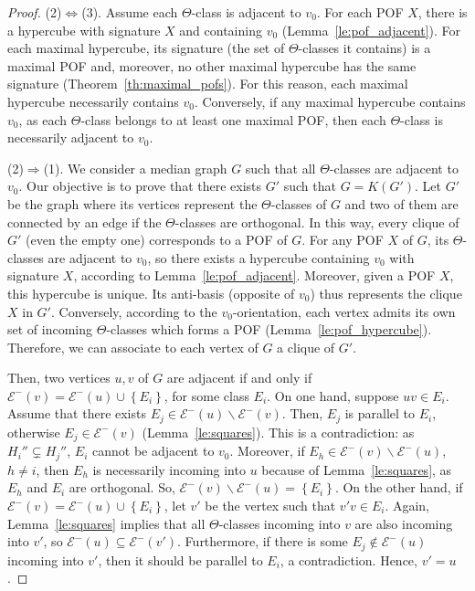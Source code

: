 \documentclass[a4paper,UKenglish,numberwithinsect,cleveref, autoref]{lipics-v2021}
\newcommand{\set}[1]{\left\{ #1 \right\}}
\begin{document}
\begin{proof}
(2)$\Leftrightarrow$(3). Assume each $\Theta$-class is adjacent to $v_0$. For each POF $X$, there is a hypercube with signature $X$ and containing $v_0$ (Lemma~\ref{le:pof_adjacent}). For each maximal hypercube, its signature (the set of $\Theta$-classes it contains) is a maximal POF and, moreover, no other maximal hypercube has the same signature (Theorem~\ref{th:maximal_pofs}). For this reason, each maximal hypercube necessarily contains $v_0$. 
Conversely, if any maximal hypercube contains $v_0$, as each $\Theta$-class belongs to at least one maximal POF, then each $\Theta$-class is necessarily adjacent to $v_0$.

(2)$\Rightarrow$(1). We consider a median graph $G$ such that all $\Theta$-classes are adjacent to $v_0$. Our objective is to prove that there exists $G'$ such that $G = K(G')$. Let $G'$ be the graph where its vertices represent the $\Theta$-classes of $G$ and two of them are connected by an edge if the $\Theta$-classes are orthogonal. In this way, every clique of $G'$ (even the empty one) corresponds to a POF of $G$. For any POF $X$ of $G$, its $\Theta$-classes are adjacent to $v_0$, so there exists a hypercube containing $v_0$ with signature $X$, according to Lemma~\ref{le:pof_adjacent}. Moreover, given a POF $X$, this hypercube is unique. Its anti-basis (opposite of $v_0$) thus represents the clique $X$ in $G'$. Conversely, according to the $v_0$-orientation, each vertex admits its own set of incoming $\Theta$-classes which forms a POF (Lemma~\ref{le:pof_hypercube}). Therefore, we can associate to each vertex of $G$ a clique of $G'$. 

Then, two vertices $u,v$ of $G$ are adjacent if and only if $\mathcal{E}^-(v) = \mathcal{E}^-(u) \cup \set{E_i}$, for some class $E_i$. On one hand, suppose $uv \in E_i$. Assume that there exists $E_j \in \mathcal{E}^-(u) \backslash \mathcal{E}^-(v)$. Then, $E_j$ is parallel to $E_i$, otherwise $E_j \in \mathcal{E}^-(v)$ (Lemma~\ref{le:squares}). This is a contradiction: as $H_i'' \subsetneq H_j''$, $E_i$ cannot be adjacent to $v_0$. Moreover, if $E_h \in \mathcal{E}^-(v) \backslash \mathcal{E}^-(u)$, $h \neq i$, then $E_h$ is necessarily incoming into $u$ because of Lemma~\ref{le:squares}, as $E_h$ and $E_i$ are orthogonal. So, $\mathcal{E}^-(v) \backslash \mathcal{E}^-(u) = \set{E_i}$. On the other hand, if $\mathcal{E}^-(v) = \mathcal{E}^-(u) \cup \set{E_i}$, let $v'$ be the vertex such that $v'v \in E_i$. Again, Lemma~\ref{le:squares} implies that all $\Theta$-classes incoming into $v$ are also incoming into $v'$, so $\mathcal{E}^-(u) \subseteq \mathcal{E}^-(v')$. Furthermore, if there is some $E_j \notin \mathcal{E}^-(u)$ incoming into $v'$, then it should be parallel to $E_i$, a contradiction. Hence, $v' = u$.


\end{proof}
\end{document}
